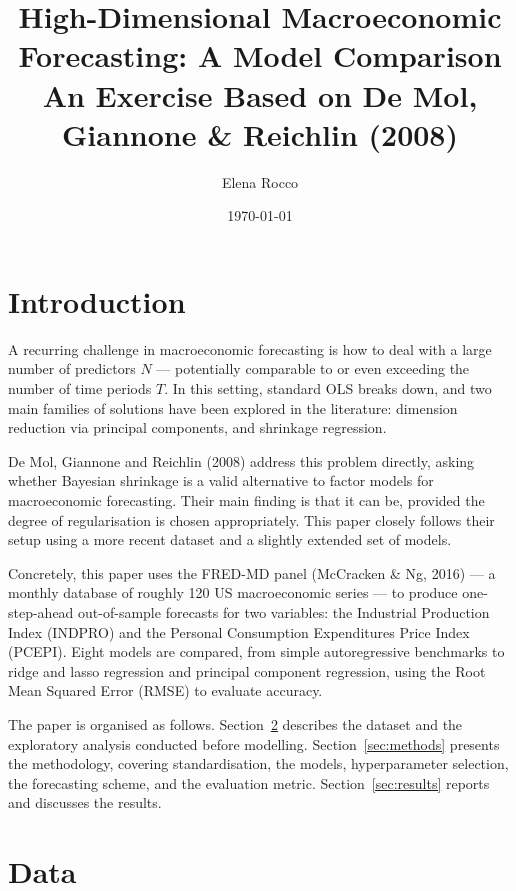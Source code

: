\documentclass[12pt, a4paper]{article}
\title{\textbf{High-Dimensional Macroeconomic Forecasting: A Model Comparison}\\[4pt]
       \large An Exercise Based on De Mol, Giannone \& Reichlin (2008)}
\author{Elena Rocco}
\date{\today}
\begin{document}
\maketitle
\tableofcontents
\newpage

\section{Introduction}
\label{sec:intro}

A recurring challenge in macroeconomic forecasting is how to deal with a large number of predictors $N$ --- potentially comparable to or even exceeding the number of time periods $T$. In this setting, standard OLS breaks down, and two main families of solutions have been explored in the literature: dimension reduction via principal components, and shrinkage regression.

De Mol, Giannone and Reichlin (2008) address this problem directly, asking whether Bayesian shrinkage is a valid alternative to factor models for macroeconomic forecasting. Their main finding is that it can be, provided the degree of regularisation is chosen appropriately. This paper closely follows their setup using a more recent dataset and a slightly extended set of models.

Concretely, this paper uses the FRED-MD panel (McCracken \& Ng, 2016) --- a monthly database of roughly 120 US macroeconomic series --- to produce one-step-ahead out-of-sample forecasts for two variables: the Industrial Production Index (INDPRO) and the Personal Consumption Expenditures Price Index (PCEPI). Eight models are compared, from simple autoregressive benchmarks to ridge and lasso regression and principal component regression, using the Root Mean Squared Error (RMSE) to evaluate accuracy.

The paper is organised as follows. Section~\ref{sec:data} describes the dataset and the exploratory analysis conducted before modelling. Section~\ref{sec:methods} presents the methodology, covering standardisation, the models, hyperparameter selection, the forecasting scheme, and the evaluation metric. Section~\ref{sec:results} reports and discusses the results.


\section{Data}
\label{sec:data}
\end{document}
